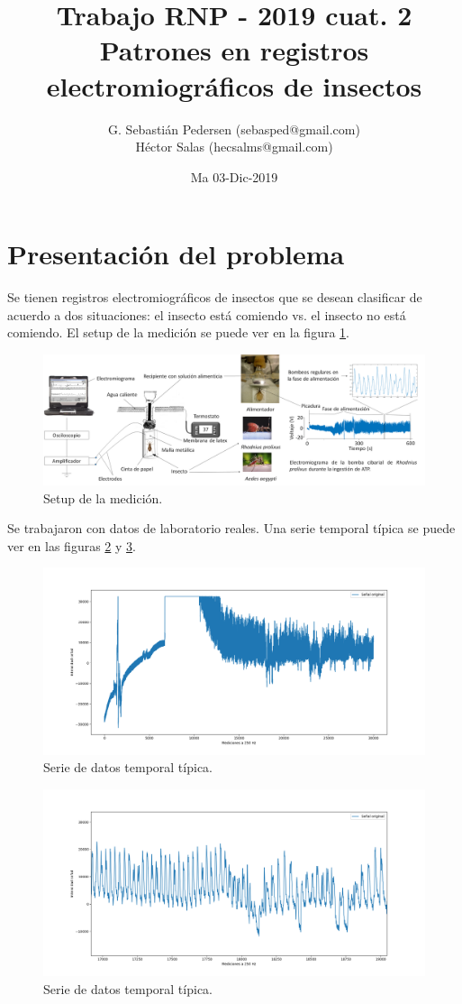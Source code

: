 \documentclass[a4paper,twocolumn]{article}
\title{Trabajo RNP - 2019 cuat. 2\\ Patrones en registros electromiográficos 
de insectos}
\author{G. Sebastián Pedersen (sebasped@gmail.com)\\
Héctor Salas (hecsalms@gmail.com)}
\date{Ma 03-Dic-2019}
\begin{document}
\maketitle

\section{Presentación del problema}
Se tienen registros electromiográficos de insectos que se desean clasificar de acuerdo a dos situaciones: el insecto está comiendo vs. el insecto no está comiendo. El setup de la medición se puede ver en la figura \ref{setup}.

\begin{figure}[ht]
	\includegraphics[trim={0cm 0cm 0cm 0cm}, clip,width=.5\textwidth]{./setup.png}
	\caption{Setup de la medición.}
	\label{setup}
\end{figure}


Se trabajaron con datos de laboratorio reales. Una serie temporal típica se puede ver en las figuras \ref{serieOrig} y \ref{serieOrig2}.

\begin{figure}[ht]
	\includegraphics[trim={3cm 1cm 3cm 1cm}, clip,width=.5\textwidth]{./senialOrig.png}
	\caption{Serie de datos temporal típica.}
	\label{serieOrig}
\end{figure}
\begin{figure}[ht]
	\includegraphics[trim={3cm 1cm 3cm 1cm}, clip,width=.5\textwidth]{./senial2Orig.png}
	\caption{Serie de datos temporal típica.}
	\label{serieOrig2}
\end{figure}
\end{document}
